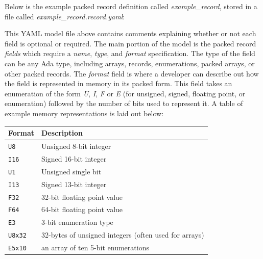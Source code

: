 Below is the example packed record definition called \textit{example\_record}, stored in a file called \textit{example\_record.record.yaml}:


This YAML model file above contains comments explaining whether or not each field is optional or required. The main portion of the model is the packed record \textit{fields} which require a \textit{name}, \textit{type}, and \textit{format} specification. The type of the field can be any Ada type, including arrays, records, enumerations, packed arrays, or other packed records. The \textit{format} field is where a developer can describe out how the field is represented in memory in its packed form. This field takes an enumeration of the form \textit{U}, \textit{I}, \textit{F} or \textit{E} (for unsigned, signed, floating point, or enumeration) followed by the number of bits used to represent it. A table of example memory representations is laid out below:

\begin{xltabular}{\textwidth}{ | l | X | }
  \hline
  \textbf{Format} & \textbf{Description} \\ \hline
    \texttt{U8} & Unsigned 8-bit integer \\ \hline
    \texttt{I16} & Signed 16-bit integer \\ \hline
    \texttt{U1} & Unsigned single bit \\ \hline
    \texttt{I13} & Signed 13-bit integer \\ \hline
    \texttt{F32} & 32-bit floating point value \\ \hline
    \texttt{F64} & 64-bit floating point value \\ \hline
    \texttt{E3} & 3-bit enumeration type \\ \hline
    \texttt{U8x32} & 32-bytes of unsigned integers (often used for arrays) \\ \hline
    \texttt{E5x10} & an array of ten 5-bit enumerations \\ \hline
\end{xltabular}

